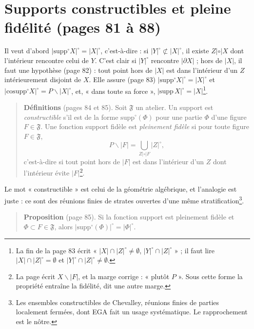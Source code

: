 \documentclass[11pt,a4paper]{article}
\begin{document}
\section*{Supports constructibles et pleine fidélité (pages 81 à 88)}

Il veut d'abord $|\mathrm{supp}^{\circ} X|^{\circ} = |X|^{\circ}$, c'est-à-dire :
si $|Y|^{\circ} \not\subset |X|^{\circ}$, il existe $Z \mathrel{|\circ|} X$ dont
l'intérieur rencontre celui de $Y$. C'est clair si $|Y|^{\circ}$ rencontre
$|\partial X|$ ; hors de $|X|$, il faut une hypothèse (page 82) : tout point
hors de $|X|$ est dans l'intérieur d'un $Z$ intérieurement disjoint de $X$. Elle
assure (page 83) $|\mathrm{supp}^{\circ} X|^{\circ} = |X|^{\circ}$ et
$|\mathrm{cosupp}^{\circ} X|^{\circ} = P \smallsetminus |X|^{\circ}$, et, « dans
toute sa force », $|\mathrm{supp}\, X|^{\circ} = |X|$\footnote{La fin de la
page 83 écrit « $|X| \cap |Z|^{\circ} \neq \emptyset$, $|Y|^{\circ} \cap
|Z|^{\circ}$ » ; il faut lire $|X| \cap |Z|^{\circ} = \emptyset$ et $|Y|^{\circ}
\cap |Z|^{\circ} \neq \emptyset$.}.

\begin{quote}
\textbf{Définitions} (pages 84 et 85). Soit $\mathfrak{F}$ un atelier. Un
support est \emph{constructible} s'il est de la forme
$\mathrm{supp}^{\circ}(\Phi)$ pour une partie $\Phi$ d'une figure $F \in
\mathfrak{F}$. Une fonction support fidèle est \emph{pleinement fidèle} si pour
toute figure $F \in \mathfrak{F}$,
\[
P \smallsetminus |F| = \bigcup_{Z \mathrel{|\circ|} F} |Z|^{\circ},
\]
c'est-à-dire si tout point hors de $|F|$ est dans l'intérieur d'un $Z$ dont
l'intérieur évite $|F|$\footnote{La page écrit $X \smallsetminus |F|$, et la
marge corrige : « plutôt $P$ ». Sous cette forme la propriété entraîne la
fidélité, dit une autre marge.}.
\end{quote}

Le mot « constructible » est celui de la géométrie algébrique, et l'analogie
est juste : ce sont des réunions finies de strates ouvertes d'une même
stratification\footnote{Les ensembles constructibles de Chevalley, réunions
finies de parties localement fermées, dont EGA fait un usage systématique. Le
rapprochement est le nôtre.}.

\begin{quote}
\textbf{Proposition} (page 85). Si la fonction support est pleinement fidèle
et $\Phi \subset F \in \mathfrak{F}$, alors $|\mathrm{supp}^{\circ}(\Phi)|^{\circ}
= |\Phi|^{\circ}$.
\end{quote}
\end{document}
